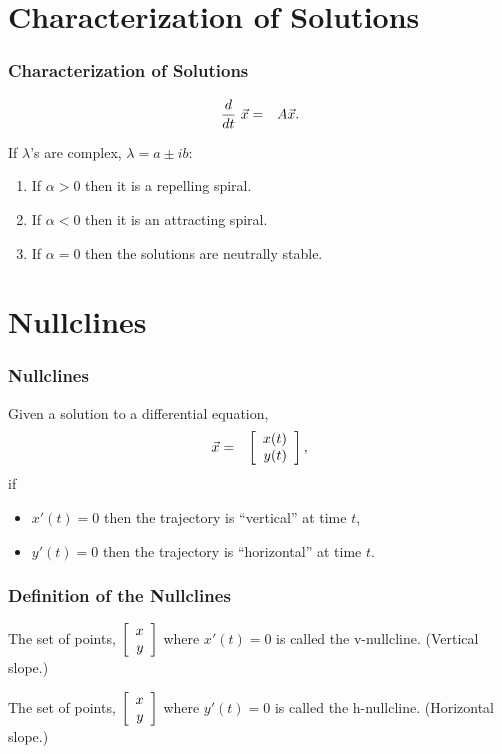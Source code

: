 \section{Characterization of Solutions}

\begin{frame}
  \frametitle{Characterization of Solutions}

  \begin{eqnarray*}
    \deriv{~}{t} \vec{x} & = & A \vec{x}.
  \end{eqnarray*}

  If $\lambda$'s are complex, $\lambda = a \pm ib$:
  \begin{enumerate}
  \item If $\alpha>0$ then it is a repelling spiral.
  \item If $\alpha<0$ then it is an attracting spiral.
  \item If $\alpha=0$ then the solutions are neutrally stable.
  \end{enumerate}

\end{frame}


\section{Nullclines}

\begin{frame}
  \frametitle{Nullclines}

  Given a solution to a differential equation,
  \begin{eqnarray*}
    \vec{x} & = & \vecTwo{x(t)}{y(t)},
  \end{eqnarray*}
  if
  \begin{itemize}
  \item $x'(t)=0$ then the trajectory is ``vertical'' at time $t$,
  \item $y'(t)=0$ then the trajectory is ``horizontal'' at time $t$.
  \end{itemize}

\end{frame}


\begin{frame}
  \frametitle{Definition of the Nullclines}

  The set of points, $\vecTwo{x}{y}$ where $x'(t)=0$ is called the v-nullcline. (Vertical slope.)

  The set of points, $\vecTwo{x}{y}$ where $y'(t)=0$ is called the h-nullcline. (Horizontal slope.)

\end{frame}


